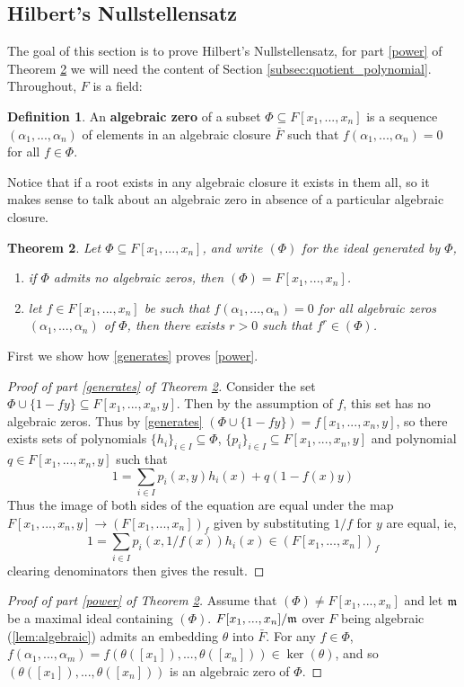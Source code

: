 \documentclass[12pt]{article}
\theoremstyle{plain}
\newtheorem{thm}{Theorem}[subsection] %
\theoremstyle{definition}
\newtheorem{defn}[thm]{Definition} %
\begin{document}
\subsection{Hilbert's Nullstellensatz}
The goal of this section is to prove Hilbert's Nullstellensatz, for part \ref{power} of Theorem \ref{thm:hilbertsnullstellensatz} we will need the content of Section \ref{subsec:quotient_polynomial}. Throughout, $F$ is a field:
\begin{defn}
\label{def:algzero}
An \textbf{algebraic zero} of a subset $\Phi \subseteq F[x_1,...,x_n]$ is a sequence $(\alpha_1,...,\alpha_n)$ of elements in an algebraic closure $\bar{F}$ such that $f(\alpha_1,...,\alpha_n) = 0$ for all $f \in \Phi$.
\end{defn}
Notice that if a root exists in any algebraic closure it exists in them all, so it makes sense to talk about an algebraic zero in absence of a particular algebraic closure.
\begin{thm}
\label{thm:hilbertsnullstellensatz}
Let $\Phi \subseteq F[x_1,...,x_n]$, and write $(\Phi)$ for the ideal generated by $\Phi$,
\begin{enumerate}
    \item\label{generates} if $\Phi$ admits no algebraic zeros, then $(\Phi) = F[x_1,...,x_n]$.
    \item\label{power} let $f \in F[x_1,...,x_n]$ be such that $f(\alpha_1,...,\alpha_n) = 0$ for all algebraic zeros $(\alpha_1,...,\alpha_n)$ of $\Phi$, then there exists $r > 0$ such that $f^r \in (\Phi)$.
\end{enumerate}
\end{thm}
First we show how \ref{generates} proves \ref{power}.
\begin{proof}[Proof of part \ref{generates} of Theorem \ref{thm:hilbertsnullstellensatz}]
Consider the set $\Phi \cup \lbrace 1 - fy\rbrace \subseteq F[x_1,...,x_n,y]$. Then by the assumption of $f$, this set has no algebraic zeros. Thus by \ref{generates} $(\Phi \cup \lbrace 1 - fy\rbrace) = f[x_1,...,x_n,y]$, so there exists sets of polynomials $\lbrace h_i\rbrace_{i \in I} \subseteq \Phi$, $\lbrace p_i\rbrace_{i \in I} \subseteq F[x_1,...,x_n,y]$ and polynomial $q \in F[x_1,...,x_n,y]$ such that
\[1 = \sum_{i \in I}p_i(x,y)h_i(x) + q(1 - f(x)y)\]
Thus the image of both sides of the equation are equal under the map $F[x_1,...,x_n,y] \to (F[x_1,...,x_n])_f$ given by substituting $1/f$ for $y$ are equal, ie,
\[1 = \sum_{i \in I}p_i(x,1/f(x))h_i(x) \in (F[x_1,...,x_n])_f\]
clearing denominators then gives the result.
\end{proof}
\begin{proof}[Proof of part \ref{power} of Theorem \ref{thm:hilbertsnullstellensatz}]
Assume that $(\Phi) \neq F[x_1,...,x_n]$ and let $\frak{m}$ be a maximal ideal containing $(\Phi)$. $F[x_1,...,x_n]/\frak{m}$ over $F$ being algebraic (\ref{lem:algebraic}) admits an embedding $\theta$ into $\bar{F}$. For any $f \in \Phi$, $f(\alpha_1,...,\alpha_m) = f(\theta([x_1]),...,\theta([x_n])) \in \operatorname{ker}(\theta)$, and so $(\theta([x_1]),...,\theta([x_n]))$ is an algebraic zero of $\Phi$.
\end{proof}
%
\end{document}
